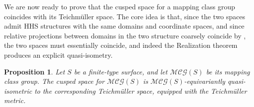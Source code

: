 \documentclass[svgnames]{amsart}
\theoremstyle{plain}
\newtheorem{prop}[thm]{Proposition}
\theoremstyle{definition}
\newcommand{\MCG}{\mathcal{MCG}}
\begin{document}
\noindent We are now ready to prove that the cusped space for a mapping class group coincides with its Teichm\"{u}ller space. The core idea is that, since the two spaces admit HHS structures with the same domains and coordinate spaces, and since relative projections between domains in the two structure coarsely coincide by , the two spaces must essentially coincide, and indeed the Realization theorem \cite[Theorem 3.1]{HHS_II} produces an explicit quasi-isometry.
\begin{prop} Let $S$ be a finite-type surface, and let $\MCG(S)$ be its mapping class group.
        The cusped space for $\MCG(S)$ is $\MCG(S)$-equivariantly quasi-isometric to the corresponding Teichm\"{u}ller space, equipped with the Teichm\"{u}ller metric.
    \end{prop}
\end{document}
